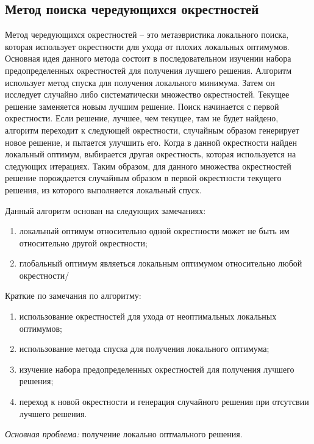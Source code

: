 \subsection{Метод поиска чередующихся окрестностей}
Метод чередующихся окрестностей -- это метаэвристика локального поиска, которая использует окрестности для 
ухода от плохих локальных оптимумов. Основная идея данного метода состоит в последовательном изучении набора
предопределенных окрестностей для получения лучшего решения. Алгоритм использует метод спуска для получения 
локального минимума. Затем он исследует случайно либо систематически множество окрестностей. Текущее решение 
заменяется новым лучшим решение. Поиск начинается с первой окрестности. Если решение, лучшее, чем текущее, 
там не будет найдено, алгоритм переходит к следующей окрестности, случайным образом генерирует новое решение, 
и пытается улучшить его. Когда в данной окрестности найден локальный оптимум, выбирается другая окрестность, 
которая используется на следующих итерациях. Таким образом, для данного множества окрестностей решение 
порождается случайным образом в первой окрестности текущего решения, из которого выполняется локальный спуск.

Данный алгоритм основан на следующих замечаниях:
\begin{enumerate}
    \item локальный оптимум относительно одной окрестности может не быть им относительно другой 
        окрестности;
    \item глобальный оптимум являеться локальным оптимумом относительно любой окрестности/
\end{enumerate}

Краткие по замечания по алгоритму:
\begin{enumerate}
    \item использование окрестностей для ухода от неоптимальных локальных оптимумов;
    \item использование метода спуска для получения локального оптимума;
    \item изучение набора предопределенных окрестностей для получения лучшего решения;
    \item переход к новой окрестности и генерация случайного решения при отсутсвии лучшего решения.
\end{enumerate}

\emph{Основная проблема:} получение локально оптмального решения.

